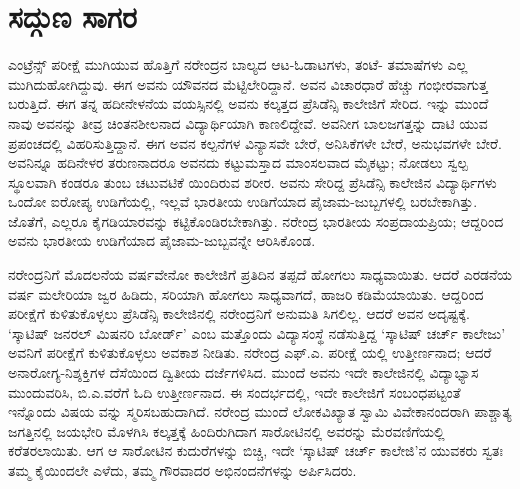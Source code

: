 
\chapter{ಸದ್ಗುಣ ಸಾಗರ}

\noindent

ಎಂಟ್ರೆನ್ಸ್ ಪರೀಕ್ಷೆ ಮುಗಿಯುವ ಹೊತ್ತಿಗೆ ನರೇಂದ್ರನ ಬಾಲ್ಯದ ಆಟ-ಓಡಾಟಗಳು, ತಂಟೆ- ತಮಾಷೆಗಳು ಎಲ್ಲ ಮುಗಿದುಹೋಗಿದ್ದುವು. ಈಗ ಅವನು ಯೌವನದ ಮೆಟ್ಟಿಲೇರಿದ್ದಾನೆ. ಅವನ ವಿಚಾರಧಾರೆ ಹೆಚ್ಚು ಗಂಭೀರವಾಗುತ್ತ ಬರುತ್ತಿದೆ. ಈಗ ತನ್ನ ಹದೀನೇಳನೆಯ ವಯಸ್ಸಿನಲ್ಲಿ ಅವನು ಕಲ್ಕತ್ತದ ಪ್ರೆಸಿಡೆನ್ಸಿ ಕಾಲೇಜಿಗೆ ಸೇರಿದ. ಇನ್ನು ಮುಂದೆ ನಾವು ಅವನನ್ನು ತೀವ್ರ ಚಿಂತನಶೀಲನಾದ ವಿದ್ಯಾರ್ಥಿಯಾಗಿ ಕಾಣಲಿದ್ದೇವೆ. ಅವನೀಗ ಬಾಲಜಗತ್ತನ್ನು ದಾಟಿ ಯುವ ಪ್ರಪಂಚದಲ್ಲಿ ವಿಹರಿಸುತ್ತಿದ್ದಾನೆ. ಈಗ ಅವನ ಕಲ್ಪನೆಗಳ ವಿನ್ಯಾಸವೇ ಬೇರೆ, ಅನಿಸಿಕೆಗಳೇ ಬೇರೆ, ಅನುಭವಗಳೇ ಬೇರೆ. ಅವನಿನ್ನೂ ಹದಿನೇಳರ ತರುಣನಾದರೂ ಅವನದು ಕಟ್ಟುಮಸ್ತಾದ ಮಾಂಸಲವಾದ ಮೈಕಟ್ಟು; ನೋಡಲು ಸ್ವಲ್ಪ ಸ್ಥೂಲವಾಗಿ ಕಂಡರೂ ತುಂಬ ಚಟುವಟಿಕೆ ಯಿಂದಿರುವ ಶರೀರ. ಅವನು ಸೇರಿದ್ದ ಪ್ರೆಸಿಡೆನ್ಸಿ ಕಾಲೇಜಿನ ವಿದ್ಯಾರ್ಥಿಗಳು ಒಂದೋ ಐರೋಪ್ಯ ಉಡಿಗೆಯಲ್ಲಿ, ಇಲ್ಲವೆ ಭಾರತೀಯ ಉಡಿಗೆಯಾದ ಪೈಜಾಮ-ಜುಬ್ಬಗಳಲ್ಲಿ ಬರಬೇಕಾಗಿತ್ತು. ಜೊತೆಗೆ, ಎಲ್ಲರೂ ಕೈಗಡಿಯಾರವನ್ನು ಕಟ್ಟಿಕೊಂಡಿರಬೇಕಾಗಿತ್ತು. ನರೇಂದ್ರ ಭಾರತೀಯ ಸಂಪ್ರದಾಯಪ್ರಿಯ; ಆದ್ದರಿಂದ ಅವನು ಭಾರತೀಯ ಉಡಿಗೆಯಾದ ಪೈಜಾಮ-ಜುಬ್ಬವನ್ನೇ ಆರಿಸಿಕೊಂಡ.

ನರೇಂದ್ರನಿಗೆ ಮೊದಲನೆಯ ವರ್ಷವೇನೋ ಕಾಲೇಜಿಗೆ ಪ್ರತಿದಿನ ತಪ್ಪದೆ ಹೋಗಲು ಸಾಧ್ಯವಾಯಿತು. ಆದರೆ ಎರಡನೆಯ ವರ್ಷ ಮಲೇರಿಯಾ ಜ್ವರ ಹಿಡಿದು, ಸರಿಯಾಗಿ ಹೋಗಲು ಸಾಧ್ಯವಾಗದೆ, ಹಾಜರಿ ಕಡಿಮೆಯಾಯಿತು. ಆದ್ದರಿಂದ ಪರೀಕ್ಷೆಗೆ ಕುಳಿತುಕೊಳ್ಳಲು ಪ್ರೆಸಿಡೆನ್ಸಿ ಕಾಲೇಜಿನಲ್ಲಿ ನರೇಂದ್ರನಿಗೆ ಅನುಮತಿ ಸಿಗಲಿಲ್ಲ. ಆದರೆ ಅವನ ಅದೃಷ್ಟಕ್ಕೆ. ‘ಸ್ಕಾಟಿಷ್ ಜನರಲ್ ಮಿಷನರಿ ಬೋರ್ಡ್​’ ಎಂಬ ಮತ್ತೊಂದು ವಿದ್ಯಾಸಂಸ್ಥೆ ನಡೆಸುತ್ತಿದ್ದ ‘ಸ್ಕಾಟಿಷ್ ಚರ್ಚ್ ಕಾಲೇಜು’ ಅವನಿಗೆ ಪರೀಕ್ಷೆಗೆ ಕುಳಿತುಕೊಳ್ಳಲು ಅವಕಾಶ ನೀಡಿತು. ನರೇಂದ್ರ ಎಫ್.ಎ. ಪರೀಕ್ಷೆ ಯಲ್ಲಿ ಉತ್ತೀರ್ಣನಾದ; ಆದರೆ ಅನಾರೋಗ್ಯ-ನಿಶ್ಶಕ್ತಿಗಳ ದೆಸೆಯಿಂದ ದ್ವಿತೀಯ ದರ್ಜೆಗಳಿಸಿದ. ಮುಂದೆ ಅವನು ಇದೇ ಕಾಲೇಜಿನಲ್ಲಿ ವಿದ್ಯಾಭ್ಯಾಸ ಮುಂದುವರಿಸಿ, ಬಿ.ಎ.ವರೆಗೆ ಓದಿ ಉತ್ತೀರ್ಣನಾದ. ಈ ಸಂದರ್ಭದಲ್ಲಿ, ಇದೇ ಕಾಲೇಜಿಗೆ ಸಂಬಂಧಪಟ್ಟಂತೆ ಇನ್ನೊಂದು ವಿಷಯ ವನ್ನು ಸ್ಮರಿಸಬಹುದಾಗಿದೆ. ನರೇಂದ್ರ ಮುಂದೆ ಲೋಕವಿಖ್ಯಾತ ಸ್ವಾಮಿ ವಿವೇಕಾನಂದರಾಗಿ ಪಾಶ್ಚಾತ್ಯ ಜಗತ್ತಿನಲ್ಲಿ ಜಯಭೇರಿ ಮೊಳಗಿಸಿ ಕಲ್ಕತ್ತಕ್ಕೆ ಹಿಂದಿರುಗಿದಾಗ ಸಾರೋಟಿನಲ್ಲಿ ಅವರನ್ನು ಮೆರವಣಿಗೆಯಲ್ಲಿ ಕರೆತರಲಾಯಿತು. ಆಗ ಆ ಸಾರೋಟಿನ ಕುದುರೆಗಳನ್ನು ಬಿಚ್ಚಿ, ಇದೇ ‘ಸ್ಕಾಟಿಷ್ ಚರ್ಚ್ ಕಾಲೇಜಿ’ನ ಯುವಕರು ಸ್ವತಃ ತಮ್ಮ ಕೈಯಿಂದಲೇ ಎಳೆದು, ತಮ್ಮ ಗೌರವಾದರ ಅಭಿನಂದನೆಗಳನ್ನು ಅರ್ಪಿಸಿದರು.

